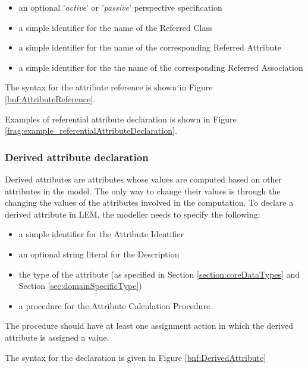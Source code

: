\begin{itemize}
\item an optional '\textit{active}' or '\textit{passive}' perspective specification
\item a simple identifier for the name of the Referred Class
\item a simple identifier for the name of the corresponding Referred Attribute
\item a simple identifier for the the name of the corresponding Referred Association
\end{itemize}

The syntax for the attribute reference is shown in Figure \ref{bnf:AttributeReference}.


Examples of referential attribute declaration is shown in Figure \ref{frag:example_referentialAttributeDeclaration}.


\subsubsection{Derived attribute declaration}
Derived attributes are attributes whose values are computed based on other attributes in the model. The only way to change their values is through the changing the values of the attributes involved in the computation. To declare a derived attribute in LEM, the modeller needs to specify the following:

\begin{itemize}
\item a simple identifier for the Attribute Identifier
\item an optional string literal for the Description
\item the type of the attribute (as specified in Section \ref{section:coreDataTypes} and Section \ref{sec:domainSpecificType})
\item a procedure for the Attribute Calculation Procedure.
\end{itemize}

The procedure should have at least one assignment action in which the derived attribute is assigned a value.

The syntax for the declaration is given in Figure \ref{bnf:DerivedAttribute}


